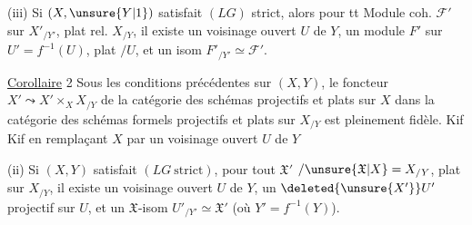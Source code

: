 (iii) Si $(X,\unsure{Y|1})$ satisfait $(LG)$ strict, alors pour tt Module coh. $\mathcal F'$ sur $X'_{/Y'}$, plat rel. $X_{/Y}$, il
existe un voisinage ouvert $U$ de $Y$,  un module $F'$ sur $U'=f^{-1}(U)$, plat $/U$, et un isom $F'_{/Y'}\simeq\mathcal F'$.

\uline{Corollaire} 2 Sous les conditions précédentes sur $(X,Y)$,  le foncteur $X'\leadsto X'\times_X X_{/Y}$ de la catégorie des schémas  projectifs et plats sur $X$ dans la catégorie des schémas formels projectifs et plats sur $X_{/Y}$ est pleinement fidèle. Kif Kif en remplaçant $X$ par un voisinage ouvert $U$ de $Y$


(ii) Si $(X,Y)$ satisfait $(LG\ \text{strict})$, pour tout $\mathfrak X'$   $/\unsure{\mathfrak X|X}=X_{/Y}$, plat sur $X_{/Y}$, il existe un voisinage ouvert $U$ de $Y$,  un $\deleted{\unsure{X'}}U'$ projectif   sur $U$, et un $\mathfrak X$-isom $U'_{/Y'}\simeq\mathfrak X'$ (où $Y'=f^{-1}(Y)$).

